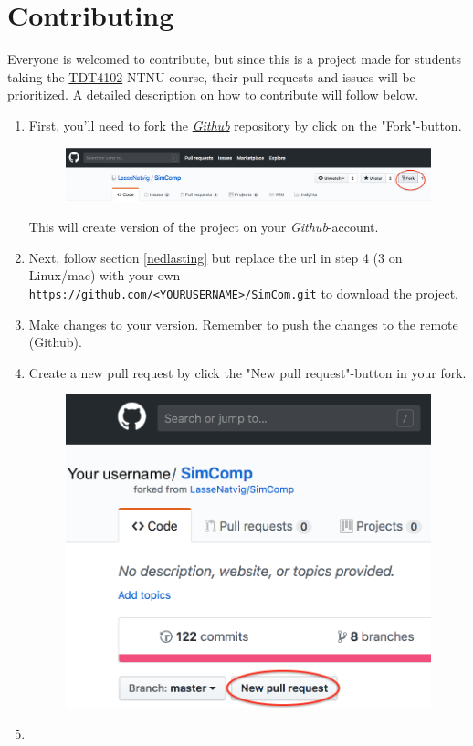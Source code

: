 \section{Contributing}
Everyone is welcomed to contribute, but since this is a project made for students taking the \href{https://www.ntnu.edu/studies/courses/TDT4102}{TDT4102} NTNU course, their pull requests and issues will be prioritized. A detailed description on how to contribute will follow below.

\begin{enumerate}
    \item First, you'll need to fork the \href{https://github.com/LasseNatvig/SimComp}{\textit{Github}} repository by click on the "Fork"-button.
    \begin{figure}[H]
        \centering
        \includegraphics[scale=0.3]{img/Fork.png}
        \label{fig:fork}
    \end{figure}
    This will create version of the project on your \textit{Github}-account. 
    \item Next, follow section \ref{nedlasting} but replace the url in step 4 (3 on Linux/mac) with your own \texttt{https://github.com/<YOURUSERNAME>/SimCom.git} to download the project.
    \item Make changes to your version. Remember to push the changes to the remote (Github).
    \item Create a new pull request by click the "New pull request"-button in your fork. 
    \begin{figure}[H]
        \centering
        \includegraphics[scale=0.3]{img/Newpullrequest.png}
        \label{fig:fork}
    \end{figure}
    \item 
\end{enumerate}


